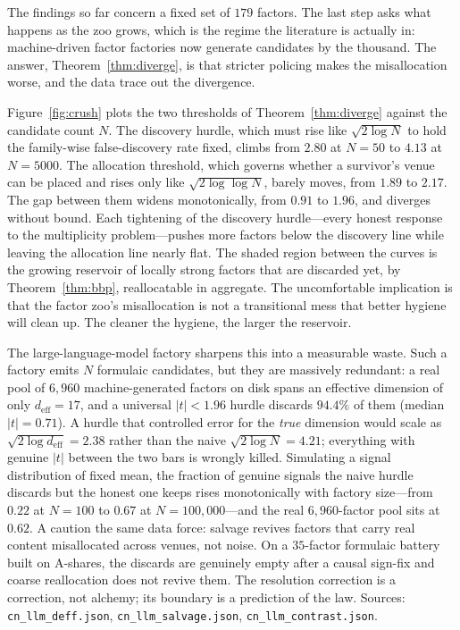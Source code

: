 \documentclass[12pt]{article}
\theoremstyle{plain}
\theoremstyle{definition}
\begin{document}
The findings so far concern a fixed set of $179$ factors. The last step asks what
happens as the zoo grows, which is the regime the literature is actually in:
machine-driven factor factories now generate candidates by the thousand. The
answer, Theorem~\ref{thm:diverge}, is that stricter policing makes the
misallocation worse, and the data trace out the divergence.

Figure~\ref{fig:crush} plots the two thresholds of Theorem~\ref{thm:diverge}
against the candidate count $N$. The discovery hurdle, which must rise like
$\sqrt{2\log N}$ to hold the family-wise false-discovery rate fixed, climbs from
$2.80$ at $N=50$ to $4.13$ at $N=5000$. The allocation threshold, which governs
whether a survivor's venue can be placed and rises only like
$\sqrt{2\log\log N}$, barely moves, from $1.89$ to $2.17$. The gap between them
widens monotonically, from $0.91$ to $1.96$, and diverges without bound. Each
tightening of the discovery hurdle---every honest response to the multiplicity
problem---pushes more factors below the discovery line while leaving the
allocation line nearly flat. The shaded region between the curves is the growing
reservoir of locally strong factors that are discarded yet, by
Theorem~\ref{thm:bbp}, reallocatable in aggregate. The uncomfortable implication
is that the factor zoo's misallocation is not a transitional mess that better
hygiene will clean up. The cleaner the hygiene, the larger the reservoir.

The large-language-model factory sharpens this into a measurable waste. Such a
factory emits $N$ formulaic candidates, but they are massively redundant: a real
pool of $6{,}960$ machine-generated factors on disk spans an effective dimension
of only $d_{\mathrm{eff}}=17$, and a universal $|t|<1.96$ hurdle discards $94.4\%$
of them (median $|t|=0.71$). A hurdle that controlled error for the \emph{true}
dimension would scale as $\sqrt{2\log d_{\mathrm{eff}}}=2.38$ rather than the
naive $\sqrt{2\log N}=4.21$; everything with genuine $|t|$ between the two bars
is wrongly killed. Simulating a signal distribution of fixed mean, the fraction
of genuine signals the naive hurdle discards but the honest one keeps rises
monotonically with factory size---from $0.22$ at $N=100$ to $0.67$ at
$N=100{,}000$---and the real $6{,}960$-factor pool sits at $0.62$. A caution the
same data force: salvage revives factors that carry real content misallocated
across venues, not noise. On a $35$-factor formulaic battery built on A-shares,
the discards are genuinely empty after a causal sign-fix and coarse reallocation
does not revive them. The resolution correction is a correction, not alchemy; its
boundary is a prediction of the law. Sources: \texttt{cn\_llm\_deff.json},
\texttt{cn\_llm\_salvage.json}, \texttt{cn\_llm\_contrast.json}.
\end{document}
